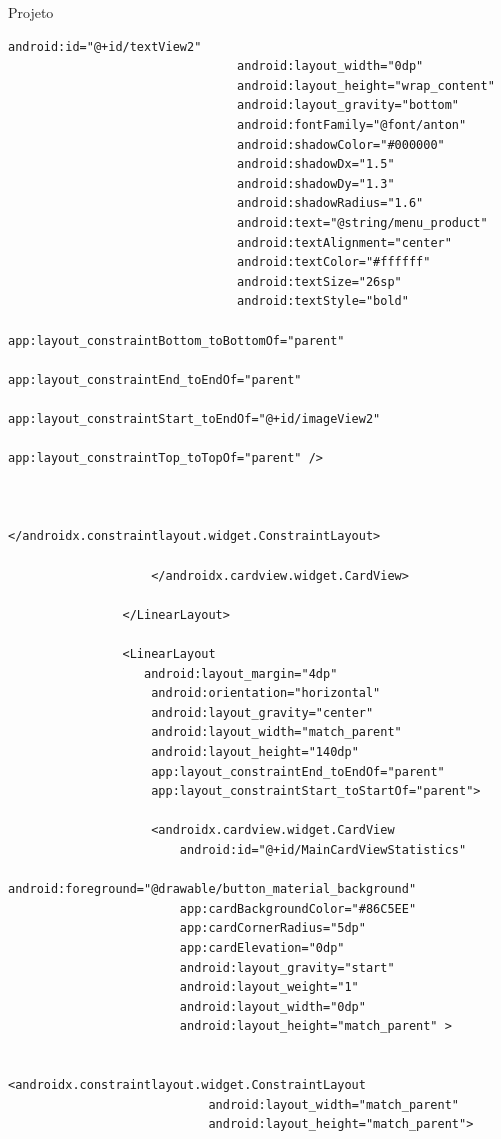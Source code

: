 \documentclass[
	12pt,				%
	openright,			%
	twoside,			%
	a4paper,			%
	english,			%
	french,				%
	spanish,			%
	brazil				%
	]{abntex2}
\begin{document}
\begin{chapter}{Projeto}
\begin{lstlisting}[numbers=none,
basicstyle=\small,
caption={Fragment Main.xml},
title={Fragment Main.xml},
xleftmargin=4pt,
label={fragment_main.xml}]
                                android:id="@+id/textView2"
                                android:layout_width="0dp"
                                android:layout_height="wrap_content"
                                android:layout_gravity="bottom"
                                android:fontFamily="@font/anton"
                                android:shadowColor="#000000"
                                android:shadowDx="1.5"
                                android:shadowDy="1.3"
                                android:shadowRadius="1.6"
                                android:text="@string/menu_product"
                                android:textAlignment="center"
                                android:textColor="#ffffff"
                                android:textSize="26sp"
                                android:textStyle="bold"
                                app:layout_constraintBottom_toBottomOf="parent"
                                app:layout_constraintEnd_toEndOf="parent"
                                app:layout_constraintStart_toEndOf="@+id/imageView2"
                                app:layout_constraintTop_toTopOf="parent" />


                        </androidx.constraintlayout.widget.ConstraintLayout>

                    </androidx.cardview.widget.CardView>

                </LinearLayout>

                <LinearLayout
                   android:layout_margin="4dp"
                    android:orientation="horizontal"
                    android:layout_gravity="center"
                    android:layout_width="match_parent"
                    android:layout_height="140dp"
                    app:layout_constraintEnd_toEndOf="parent"
                    app:layout_constraintStart_toStartOf="parent">

                    <androidx.cardview.widget.CardView
                        android:id="@+id/MainCardViewStatistics"
                        android:foreground="@drawable/button_material_background"
                        app:cardBackgroundColor="#86C5EE"
                        app:cardCornerRadius="5dp"
                        app:cardElevation="0dp"
                        android:layout_gravity="start"
                        android:layout_weight="1"
                        android:layout_width="0dp"
                        android:layout_height="match_parent" >

                        <androidx.constraintlayout.widget.ConstraintLayout
                            android:layout_width="match_parent"
                            android:layout_height="match_parent">


\end{lstlisting}
\end{chapter}
\end{document}
